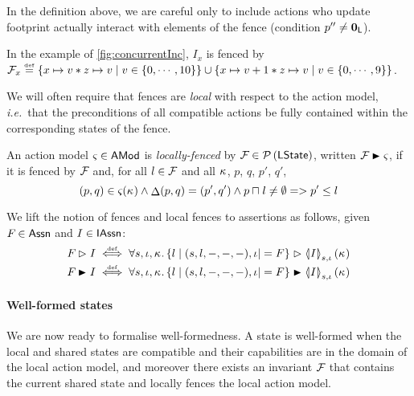 In the definition above, we are careful only to include actions who
update footprint actually interact with elements of the fence
(condition $p'' \neq \mathbf{0}_{\textsf{L}}$).

In the example of \fig\ref{fig:concurrentInc}, $I_x$ is fenced by
$\mathcal{F}_{x} \mathrel{\stackrel{\smash{\scriptscriptstyle{\mathrm{def}}}}{=}} \left\{x \mapsto v * z \mapsto v \mid v \in \{0,
\cdots, 10\} \right\} \cup \left\{x \mapsto v+1 * z \mapsto v \mid v
\in \{0 ,\cdots, 9 \}\right\}$.

We will often require that fences are \emph{local} with respect to the
action model, \textit{i.e.}\ that the preconditions of all compatible
actions be fully contained within the corresponding states of the
fence.


\begin{definition}
  An action model $\varsigma_{} \in \textsf{AMod}$ is \emph{locally-fenced} by
  $\mathcal{F}_{} \in \mathcal{P}\left(\textsf{LState} \right)$, written $\fence{} \strictfences
  \amod{}$, if it is fenced by $\mathcal{F}_{}$ and, for all $l\in\mathcal{F}_{}$
  and all $\kappa_{}$, $p$, $q$, $p'$, $q'$,
  \[
  (p, q) \in \varsigma_{}(\kappa_{}) \land 
  \mathop{\Delta}(p, q) = (p', q') \land 
  p \sqcap_{} l \neq \emptyset
  =>
  p' \leq l
  \]
\end{definition}

We lift the notion of fences and local fences to
assertions as follows, given $F_{} \in \textsf{Assn}$ and $I \in
\textsf{IAssn}$:
\begin{align*}
  \fenceAss{} \fences I &\iffdef \for{s,\lenv,\ca{}}
  \{ l \mid (s,l, -, -, -), \lenv |= F \} \fences \semI[s,\lenv]{I}(\ca{})\\
  \fenceAss{} \strictfences I &\iffdef \for{s,\lenv,\ca{}}
  \{ l \mid (s,l, -, -, -), \lenv |= F \} \strictfences \semI[s,\lenv]{I}(\ca{})
\end{align*}




\paragraph{Well-formed states}
We are now ready to formalise well-formedness.  A state is well-formed
when the local and shared states are compatible and their capabilities
are in the domain of the local action model, and moreover there exists
an invariant $\mathcal{F}_{}$ that contains the current shared state and
locally fences the local action model.

